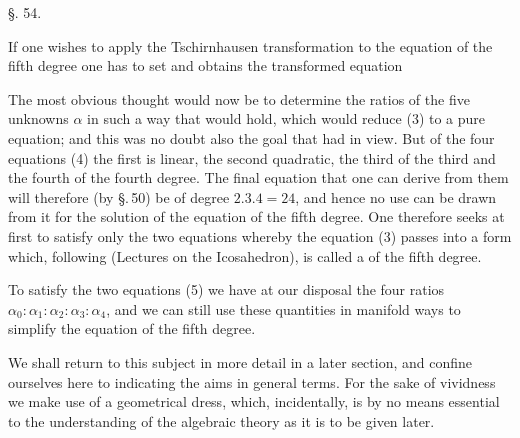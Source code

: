 
\begin{center}
§. 54.

\end{center}

If one wishes to apply the Tschirnhausen transformation to the equation of the fifth degree
one has to set
and obtains the transformed equation

The most obvious thought would now be to determine the ratios of the
five unknowns $\alpha$ in such a way that
would hold, which would reduce (3) to a pure equation; and
this was no doubt also the goal that  had in
view. But of the four equations (4) the first is linear,
the second quadratic, the third of the third and the fourth of the
fourth degree. The final equation that one can derive from them
will therefore (by \S.\,50) be of degree $2.3.4 = 24$, and hence
no use can be drawn from it for the solution of the equation of the
fifth degree. One therefore seeks at first to satisfy only the
two equations
whereby the equation (3) passes into a form which, following
 (Lectures on the Icosahedron), is called a  of the fifth degree.

To satisfy the two equations (5) we have at our
disposal the four ratios $\alpha_0 : \alpha_1 : \alpha_2 : \alpha_3 : \alpha_4$, and we
can still use these quantities in manifold ways to simplify the equation of the fifth degree.

We shall return to this subject in more detail in a later
section, and confine ourselves here to indicating the
aims in general terms. For the sake of vividness
we make use of a geometrical dress, which, incidentally,
is by no means essential to the understanding of the algebraic theory
as it is to be given later.
